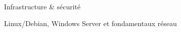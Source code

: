 \begin{cventries}
  \zcventry
    {Infrastructure \& sécurité} %
    {
      \begin{cvitems} %
        \item {Linux/Debian, Windows Server et fondamentaux réseau}
      \end{cvitems}
    }

\end{cventries}
